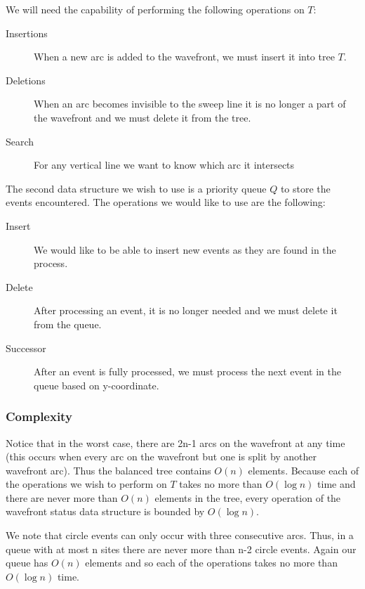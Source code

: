 \documentclass[10pt]{article}
\begin{document}
We will need the capability of performing the following operations on $T$:\begin{description}

\item[Insertions] When a new arc is added to the wavefront, we must insert it
into tree $T$.

\item[Deletions] When an arc becomes invisible to the sweep line it is no
longer a part of the wavefront and we must delete it from the tree.

\item[Search] For any vertical line we want to know which arc it
intersects

\end{description}


The second data structure we wish to use is a priority queue $Q$ to store the
events encountered.  The operations we would like to use are the following:\begin{description}

\item[Insert] We would like to be able to insert new events as they are found
in the process.

\item[Delete] After processing an event, it is no longer needed and we must
delete it from the queue.

\item[Successor] After an event is fully processed, we must process the next
 event in the queue based on y-coordinate.

\end{description}



\subsubsection{Complexity}

Notice that in the worst case, there are 2n-1 arcs on the wavefront at any
time (this occurs when every arc on the wavefront but one is split by another
wavefront arc).  Thus the balanced tree contains $O(n)$ elements.
Because each of the operations we wish to perform on $T$ takes no more than
$O(\log n)$ time and there are never more than $O(n)$ elements in the tree,
every operation of the wavefront status data structure is bounded by $O(\log n)$.

We note that circle events can only occur with three consecutive arcs.  Thus,
in a queue with at most n sites there are never more than n-2 circle events.  
Again our queue has $O(n)$ elements and so each of the operations takes no more
than $O(\log n)$ time.
\end{document}
